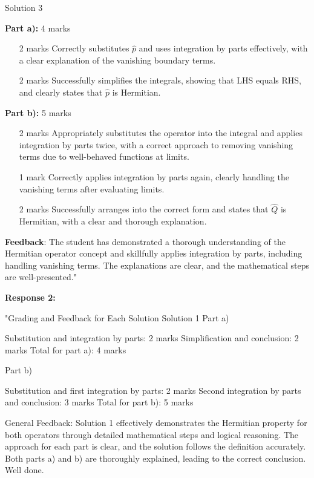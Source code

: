 \documentclass[a4paper,11pt]{article}
\begin{document}
Solution 3

\textbf{Part a):} 4 marks
\begin{itemize}
    \item [2 marks] Correctly substitutes \( \hat{p} \) and uses integration by parts effectively, with a clear explanation of the vanishing boundary terms.
    \item [2 marks] Successfully simplifies the integrals, showing that LHS equals RHS, and clearly states that \( \hat{p} \) is Hermitian.
\end{itemize}

\textbf{Part b):} 5 marks
\begin{itemize}
    \item [2 marks] Appropriately substitutes the operator into the integral and applies integration by parts twice, with a correct approach to removing vanishing terms due to well-behaved functions at limits.
    \item [1 mark] Correctly applies integration by parts again, clearly handling the vanishing terms after evaluating limits.
    \item [2 marks] Successfully arranges into the correct form and states that \(\hat{Q}\) is Hermitian, with a clear and thorough explanation.
\end{itemize}

\textbf{Feedback}: The student has demonstrated a thorough understanding of the Hermitian operator concept and skillfully applies integration by parts, including handling vanishing terms. The explanations are clear, and the mathematical steps are well-presented."

\textbf{Response 2:}

"Grading and Feedback for Each Solution
Solution 1
Part a)

Substitution and integration by parts: 2 marks
Simplification and conclusion: 2 marks
Total for part a): 4 marks

Part b)

Substitution and first integration by parts: 2 marks
Second integration by parts and conclusion: 3 marks
Total for part b): 5 marks

General Feedback: Solution 1 effectively demonstrates the Hermitian property for both operators through detailed mathematical steps and logical reasoning. The approach for each part is clear, and the solution follows the definition accurately. Both parts a) and b) are thoroughly explained, leading to the correct conclusion. Well done.
\end{document}

